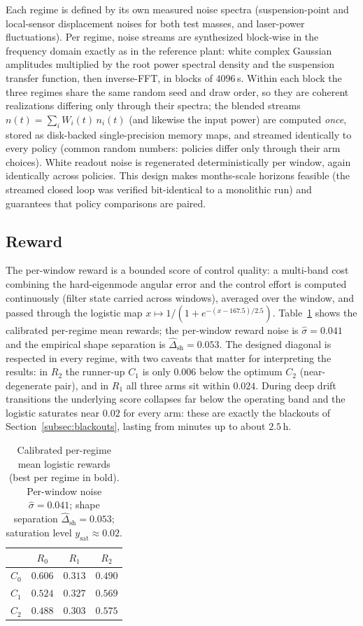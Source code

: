 \documentclass[11pt]{article}
\begin{document}
Each regime is defined by its own measured noise spectra (suspension-point and local-sensor displacement noises for both test masses, and laser-power fluctuations). Per regime, noise streams are synthesized block-wise in the frequency domain exactly as in the reference plant: white complex Gaussian amplitudes multiplied by the root power spectral density and the suspension transfer function, then inverse-FFT, in blocks of $4096$\,s. Within each block the three regimes share the same random seed and draw order, so they are coherent realizations differing only through their spectra; the blended streams $n(t)=\sum_i W_i(t)\,n_i(t)$ (and likewise the input power) are computed \emph{once}, stored as disk-backed single-precision memory maps, and streamed identically to every policy (common random numbers: policies differ only through their arm choices). White readout noise is regenerated deterministically per window, again identically across policies. This design makes months-scale horizons feasible (the streamed closed loop was verified bit-identical to a monolithic run) and guarantees that policy comparisons are paired.

\subsection{Reward}
\label{subsec:reward_experiments}

The per-window reward is a bounded score of control quality: a multi-band cost combining the hard-eigenmode angular error and the control effort is computed continuously (filter state carried across windows), averaged over the window, and passed through the logistic map $x\mapsto 1/(1+e^{-(x-167.5)/2.5})$. Table~\ref{tab:reward_table} shows the calibrated per-regime mean rewards; the per-window reward noise is $\widehat\sigma=0.041$ and the empirical shape separation is $\widehat\Delta_{\mathrm{sh}}=0.053$. The designed diagonal is respected in every regime, with two caveats that matter for interpreting the results: in $R_2$ the runner-up $C_1$ is only $0.006$ below the optimum $C_2$ (near-degenerate pair), and in $R_1$ all three arms sit within $0.024$. During deep drift transitions the underlying score collapses far below the operating band and the logistic saturates near $0.02$ for every arm: these are exactly the blackouts of Section~\ref{subsec:blackouts}, lasting from minutes up to about $2.5$\,h.

\begin{table}[h]
\centering
\begin{tabular}{lccc}
\toprule
 & $R_0$ & $R_1$ & $R_2$ \\
\midrule
$C_0$ & $\mathbf{0.606}$ & $0.313$ & $0.490$ \\
$C_1$ & $0.524$ & $\mathbf{0.327}$ & $0.569$ \\
$C_2$ & $0.488$ & $0.303$ & $\mathbf{0.575}$ \\
\bottomrule
\end{tabular}
\caption{Calibrated per-regime mean logistic rewards (best per regime in bold). Per-window noise $\widehat\sigma=0.041$; shape separation $\widehat\Delta_{\mathrm{sh}}=0.053$; saturation level $y_{\mathrm{sat}}\approx0.02$.}
\label{tab:reward_table}
\end{table}
\end{document}

